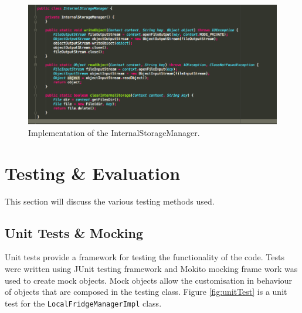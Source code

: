 \documentclass[a4paper, 11pt]{article}
\begin{document}
\begin{figure}[!htbp]
\centering
\includegraphics[width=\textwidth]{serializable}
\caption{Implementation of the InternalStorageManager.}\label{fig:serializable}
\end{figure}
\clearpage


\section{Testing \& Evaluation}
This section will discuss the various testing methods used.

\subsection{Unit Tests \& Mocking} Unit tests provide a framework for testing the functionality of the code. Tests were written using JUnit testing framework and Mokito mocking frame work was used to create mock objects. Mock objects allow the customisation in behaviour of objects that are composed in the testing class. Figure \ref{fig:unitTest} is a unit test for the \texttt{LocalFridgeManagerImpl} class. 
  
\vspace{\baselineskip}
\end{document}
